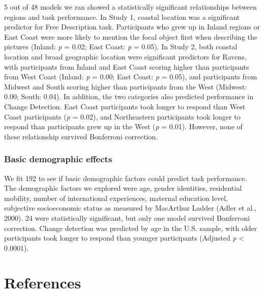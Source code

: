 \documentclass[
  man]{apa6}
\begin{document}
5 out of 48 models we ran showed a statistically significant relationships between regions and task performance. In Study 1, coastal location was a significant predictor for Free Description task. Participants who grew up in Inland regions or East Coast were more likely to mention the focal object first when describing the pictures (Inland: \emph{p} = 0.02; East Coast: \emph{p} = 0.05). In Study 2, both coastal location and broad geographic location were significant predictors for Ravens, with participants from Inland and East Coast scoring higher than participants from West Coast (Inland: \emph{p} = 0.00; East Coast: \emph{p} = 0.05), and participants from Midwest and South scoring higher than participants from the West (Midwest: 0.00; South: 0.04). In addition, the two categories also predicted performance in Change Detection. East Coast participants took longer to respond than West Coast participants (\emph{p} = 0.02), and Northeastern participants took longer to respond than participants grew up in the West (\emph{p} = 0.01). However, none of these relationship survived Bonferroni correction.

\hypertarget{basic-demographic-effects}{%
\subsubsection{Basic demographic effects}\label{basic-demographic-effects}}

We fit 192 to see if basic demographic factors could predict task performance. The demographic factors we explored were age, gender identities, residential mobility, number of international experiences, maternal education level, subjective socioeconomic status as measured by MacArthur Ladder (Adler et al., 2000). 24 were statistically significant, but only one model survived Bonferroni correction. Change detection was predicted by age in the U.S. sample, with older participants took longer to respond than younger participants (Adjusted \emph{p} \textless{} 0.0001).

\setlength{\parindent}{-0.5in}
\setlength{\leftskip}{0.5in}

\newpage

\hypertarget{references}{%
\section{References}\label{references}}
\end{document}
